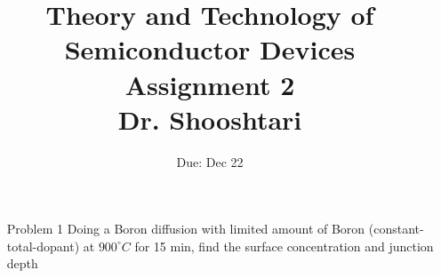 \documentclass{report}
\title{Theory and Technology of Semiconductor Devices\\ Assignment 2 \\ \vspace{30pt} Dr. Shooshtari}
\author{}
\date{Due: Dec 22}
\begin{document}
	\maketitle
	
	\begin{enumerate}
		\item[Problem 1] Doing a Boron diffusion with limited amount of Boron (constant-total-dopant) at $900^{\circ} C$ for 15 min, find the surface concentration and junction depth
	\end{enumerate}
\end{document}
